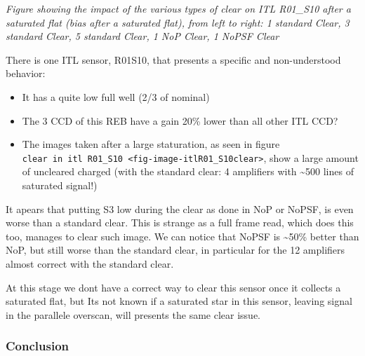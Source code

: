 \emph{Figure showing the impact of the various types of clear on ITL
R01\_S10 after a saturated flat (bias after a saturated flat), from left
to right: 1 standard Clear, 3 standard Clear, 5 standard Clear, 1 NoP
Clear, 1 NoPSF Clear}

There is one ITL sensor, R01\label{s10}{S10}, that
presents a specific and non-understood behavior:

\begin{itemize}
\tightlist
\item
  It has a quite low full well (2/3 of nominal)
\item
  The 3 CCD of this REB have a gain 20\% lower than all other ITL CCD?
\item
  The images taken after a large staturation, as seen in figure
  \texttt{clear\ in\ itl\ R01\_S10\ \textless{}fig-image-itlR01\_S10clear\textgreater{}},
  show a large amount of uncleared charged (with the standard clear: 4
  amplifiers with \textasciitilde500 lines of saturated signal!)
\end{itemize}

It apears that putting S3 low during the clear as done in NoP or NoPSF,
is even worse than a standard clear. This is strange as a full frame
read, which does this too, manages to clear such image. We can notice
that NoPSF is \textasciitilde50\% better than NoP, but still worse than
the standard clear, in particular for the 12 amplifiers almost correct
with the standard clear.

At this stage we don\textquotesingle t have a correct way to clear this
sensor once it collects a saturated flat, but It\textquotesingle s not
known if a saturated star in this sensor, leaving signal in the
parallele overscan, will presents the same clear issue.

\subsubsection{Conclusion}\label{conclusion}

\begin{quote}
\end{quote}


